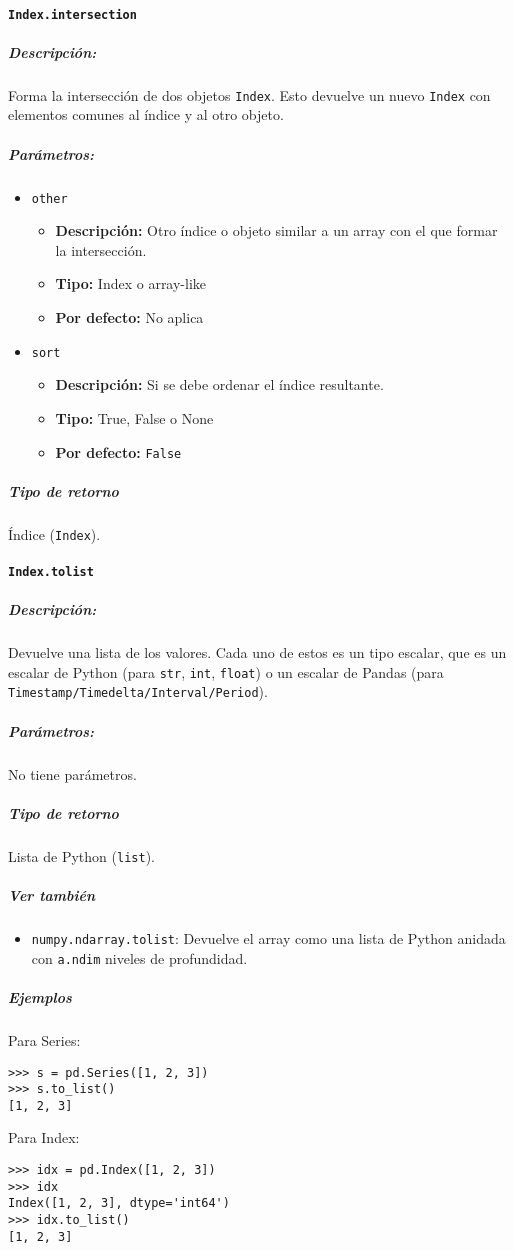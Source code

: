 \paragraph{\texttt{Index.intersection}}
\subparagraph{Descripción:}
Forma la intersección de dos objetos \texttt{Index}. Esto devuelve un nuevo \texttt{Index} con elementos comunes al índice y al otro objeto.
\subparagraph{Parámetros:}
\begin{itemize}
\item \texttt{other}
\begin{itemize}
\item \textbf{Descripción:} Otro índice o objeto similar a un array con el que formar la intersección.
\item \textbf{Tipo:} Index o array-like
\item \textbf{Por defecto:} No aplica
\end{itemize}
\item \texttt{sort}
\begin{itemize}
\item \textbf{Descripción:} Si se debe ordenar el índice resultante.
\item \textbf{Tipo:} True, False o None
\item \textbf{Por defecto:} \texttt{False}
\end{itemize}
\end{itemize}
\subparagraph{Tipo de retorno}
Índice (\texttt{Index}).
\paragraph{\texttt{Index.tolist}}
\subparagraph{Descripción:}
Devuelve una lista de los valores. Cada uno de estos es un tipo escalar, que es un escalar de Python (para \texttt{str}, \texttt{int}, \texttt{float}) o un escalar de Pandas (para \texttt{Timestamp/Timedelta/Interval/Period}).
\subparagraph{Parámetros:}
No tiene parámetros.
\subparagraph{Tipo de retorno}
Lista de Python (\texttt{list}).
\subparagraph{Ver también}
\begin{itemize}
\item \texttt{numpy.ndarray.tolist}: Devuelve el array como una lista de Python anidada con \texttt{a.ndim} niveles de profundidad.
\end{itemize}
\subparagraph{Ejemplos}
Para Series:
\begin{verbatim}
>>> s = pd.Series([1, 2, 3])
>>> s.to_list()
[1, 2, 3]
\end{verbatim}
Para Index:
\begin{verbatim}
>>> idx = pd.Index([1, 2, 3])
>>> idx
Index([1, 2, 3], dtype='int64')
>>> idx.to_list()
[1, 2, 3]
\end{verbatim}
